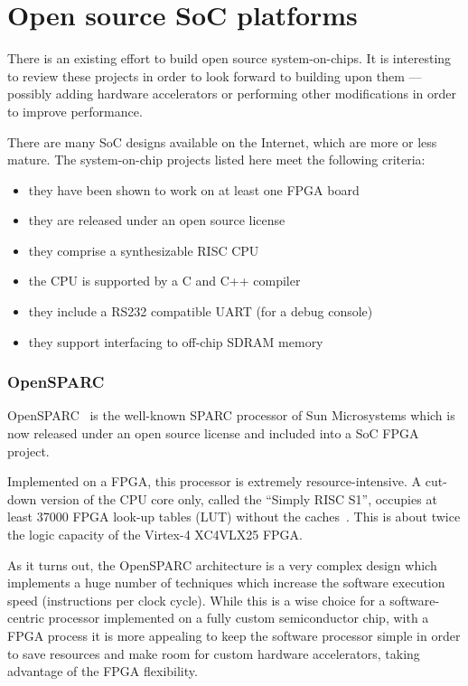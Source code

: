 \documentclass[a4paper,11pt]{kthesis}
\begin{document}
\section{Open source SoC platforms}
There is an existing effort to build open source system-on-chips. It is interesting to review these projects in order to look forward to building upon them --- possibly adding hardware accelerators or performing other modifications in order to improve performance.

There are many SoC designs available on the Internet, which are more or less mature. The system-on-chip projects listed here meet the following criteria:
\begin{itemize}
\item they have been shown to work on at least one FPGA board
\item they are released under an open source license
\item they comprise a synthesizable RISC CPU
\item the CPU is supported by a C and C++ compiler
\item they include a RS232 compatible UART (for a debug console)
\item they support interfacing to off-chip SDRAM memory
\end{itemize}

\subsubsection{OpenSPARC}
OpenSPARC~\cite{opensparc} is the well-known SPARC processor of Sun Microsystems which is now released under an open source license and included into a SoC FPGA project.

Implemented on a FPGA, this processor is extremely resource-intensive. A cut-down version of the CPU core only, called the ``Simply RISC S1'', occupies at least 37000 FPGA look-up tables (LUT) without the caches~\cite{simplyrisc}. This is about twice the logic capacity of the Virtex-4 XC4VLX25 FPGA.

As it turns out, the OpenSPARC architecture is a very complex design which implements a huge number of techniques which increase the software execution speed (instructions per clock cycle). While this is a wise choice for a software-centric processor implemented on a fully custom semiconductor chip, with a FPGA process it is more appealing to keep the software processor simple in order to save resources and make room for custom hardware accelerators, taking advantage of the FPGA flexibility.
\end{document}
